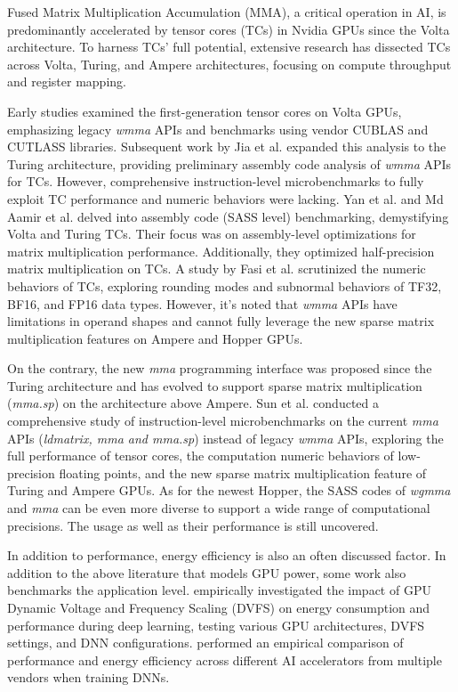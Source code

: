Fused Matrix Multiplication Accumulation (MMA), a critical operation in AI, is predominantly accelerated by tensor cores (TCs) in Nvidia GPUs since the Volta architecture. To harness TCs' full potential, extensive research has dissected TCs across Volta, Turing, and Ampere architectures, focusing on compute throughput and register mapping.

Early studies \cite{markidis_tensor_ipdpsw2018,benchmark_Martineau_eupar2019} examined the first-generation tensor cores on Volta GPUs, emphasizing legacy \emph{wmma} APIs and benchmarks using vendor CUBLAS and CUTLASS libraries. Subsequent work by Jia et al. \cite{jia2018dissecting,jia2019dissecting} expanded this analysis to the Turing architecture, providing preliminary assembly code analysis of \emph{wmma} APIs for TCs. However, comprehensive instruction-level microbenchmarks to fully exploit TC performance and numeric behaviors were lacking. Yan et al. and Md Aamir et al. \cite{yan_ipdps_2020,yan_optimize_ppopp2020,raihan_ispass2019} delved into assembly code (SASS level) benchmarking, demystifying Volta and Turing TCs. Their focus was on assembly-level optimizations for matrix multiplication performance. Additionally, they optimized half-precision matrix multiplication on TCs. A study by Fasi et al. \cite{fasi2021numerical} scrutinized the numeric behaviors of TCs, exploring rounding modes and subnormal behaviors of TF32, BF16, and FP16 data types. However, it's noted that \emph{wmma} APIs have limitations in operand shapes and cannot fully leverage the new sparse matrix multiplication features on Ampere and Hopper GPUs.

On the contrary, the new \emph{mma} programming interface was proposed since the Turing architecture and has evolved to support sparse matrix multiplication (\emph{mma.sp}) on the architecture above Ampere. Sun et al. \cite{sun_tpds_2023} conducted a comprehensive study of instruction-level microbenchmarks on the current \emph{mma} APIs (\emph{ldmatrix, mma and mma.sp}) instead of legacy \emph{wmma} APIs, exploring the full performance of tensor cores, the computation numeric behaviors of low-precision floating points, and the new sparse matrix multiplication feature of Turing and Ampere GPUs. As for the newest Hopper, the SASS codes of \emph{wgmma} and \emph{mma} can be even more diverse to support a wide range of computational precisions. The usage as well as their performance is still uncovered.

In addition to performance, energy efficiency is also an often discussed factor. In addition to the above literature that models GPU power, some work also benchmarks the application level. \cite{tang2019impact} empirically investigated the impact of GPU Dynamic Voltage and Frequency Scaling (DVFS) on energy consumption and performance during deep learning, testing various GPU architectures, DVFS settings, and DNN configurations. \cite{wang2020benchmarking} performed an empirical comparison of performance and energy efficiency across different AI accelerators from multiple vendors when training DNNs.

